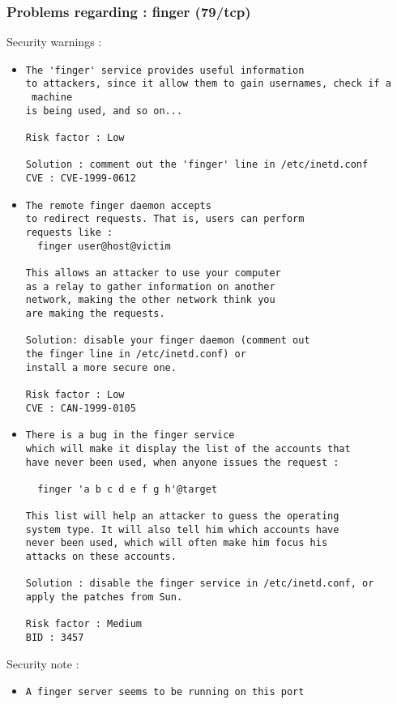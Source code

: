 \documentclass{article}
\begin{document}
\subsubsection{Problems regarding : finger (79/tcp)}
Security warnings :\\
\begin{itemize}
\item \begin{verbatim}
The 'finger' service provides useful information
to attackers, since it allow them to gain usernames, check if a
 machine
is being used, and so on... 

Risk factor : Low

Solution : comment out the 'finger' line in /etc/inetd.conf
CVE : CVE-1999-0612
\end{verbatim}\item \begin{verbatim}
The remote finger daemon accepts
to redirect requests. That is, users can perform
requests like :
  finger user@host@victim

This allows an attacker to use your computer
as a relay to gather information on another
network, making the other network think you
are making the requests.

Solution: disable your finger daemon (comment out
the finger line in /etc/inetd.conf) or 
install a more secure one.

Risk factor : Low
CVE : CAN-1999-0105
\end{verbatim}\item \begin{verbatim}
There is a bug in the finger service
which will make it display the list of the accounts that
have never been used, when anyone issues the request :

  finger 'a b c d e f g h'@target
  
This list will help an attacker to guess the operating
system type. It will also tell him which accounts have
never been used, which will often make him focus his
attacks on these accounts.

Solution : disable the finger service in /etc/inetd.conf, or
apply the patches from Sun.

Risk factor : Medium
BID : 3457
\end{verbatim}\end{itemize}
Security note :\\
\begin{itemize}
\item \begin{verbatim}
A finger server seems to be running on this port
\end{verbatim}\end{itemize}
\end{document}
